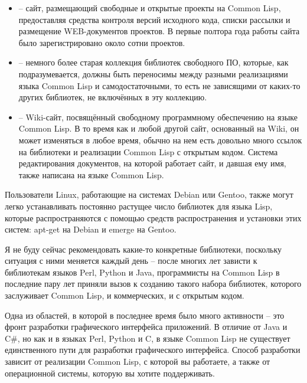 \begin{itemize}
\item {} -- сайт, размещающий свободные
  и открытые проекты на Common Lisp, предоставляя средства контроля версий исходного кода,
  списки рассылки и размещение WEB-документов проектов. В первые полтора года работы сайта
  было зарегистрировано около сотни проектов.

\item {} -- немного более старая коллекция библиотек
  свободного ПО, которые, как подразумевается, должны быть переносимы между разными
  реализациями языка Common Lisp и самодостаточными, то есть не зависящими от каких-то
  других библиотек, не включённых в эту коллекцию.

\item {} -- Wiki-сайт, посвящённый
  свободному программному обеспечению на языке Common Lisp. В то время как и любой другой
  сайт, основанный на Wiki, он может изменяться в любое время, обычно на нем есть довольно
  много ссылок на библиотеки и реализации Common Lisp с открытым кодом. Система
  редактирования документов, на которой работает сайт, и давшая ему имя, также написана на
  языке Common Lisp.
\end{itemize}

Пользователи Linux, работающие на системах Debian или Gentoo, также могут легко
устанавливать постоянно растущее число библиотек для языка Lisp, которые распространяются
с помощью средств распространения и установки этих систем: apt-get на Debian и emerge на
Gentoo.

Я не буду сейчас рекомендовать какие-то конкретные библиотеки, поскольку ситуация с ними
меняется каждый день -- после многих лет зависти к библиотекам языков Perl, Python и Java,
программисты на Common Lisp в последние пару лет приняли вызов к созданию такого набора
библиотек, которого заслуживает Common Lisp, и коммерческих, и с открытым кодом.

Одна из областей, в которой в последнее время было много активности -- это фронт
разработки графического интерфейса приложений. В отличие от Java и C\#, но как и в языках
Perl, Python и C, в языке Common Lisp не существует единственного пути для разработки
графического интерфейса. Способ разработки зависит от реализации Common Lisp, с которой вы
работаете, а также от операционной системы, которую вы хотите поддерживать.

